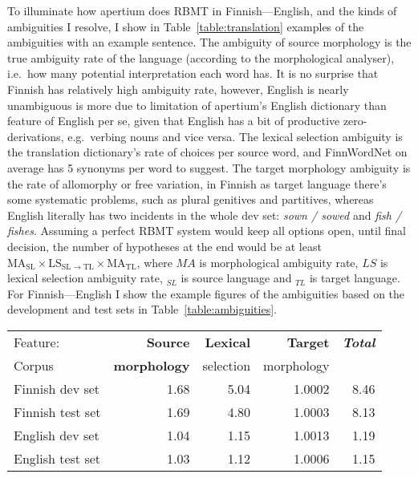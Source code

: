 \documentclass[free]{flammie}
\begin{document}
To illuminate how apertium does RBMT in Finnish---English, and the kinds of
ambiguities I resolve, I show in Table~\ref{table:translation} examples of the
ambiguities with an example sentence. The ambiguity of source morphology is the
true ambiguity rate of the language (according to the morphological analyser),
i.e.\ how many potential interpretation each word has. It is no surprise that
Finnish has relatively high ambiguity rate, however, English is nearly
unambiguous is more due to limitation of apertium's English dictionary than
feature of English per se, given that English has a bit of productive
zero-derivations, e.g.\ verbing nouns and vice versa. The lexical selection
ambiguity is the translation dictionary's rate of choices per source word, and
FinnWordNet on average has 5 synonyms per word to suggest. The target morphology
ambiguity is the rate of allomorphy or free variation, in Finnish as target
language there's some systematic problems, such as plural genitives and
partitives, whereas English literally has two incidents in the whole dev set:
\textit{sown / sowed} and \textit{fish / fishes}.  Assuming a perfect RBMT
system would keep all options open, until final decision, the number of
hypotheses at the end would be at least
$\mathrm{MA_{SL}}\times\mathrm{LS_{SL\rightarrow TL}}\times\mathrm{MA_{TL}}$,
where $MA$ is morphological ambiguity rate, $LS$ is lexical selection ambiguity
rate, $_{SL}$ is source language and $_{TL}$ is target language. For
Finnish---English I show the example figures of the ambiguities based on the
development and test sets in Table~\ref{table:ambiguities}.

\begin{table*}
    \begin{center}
    \begin{tabular}{lrrrr}
        \toprule
        \hfill Feature: & \bf Source & \bf Lexical & \bf
        Target & \bf \it Total\\
        Corpus & \bf morphology & selection & morphology & \\
        \midrule
        Finnish dev set & 1.68 & 5.04 & 1.0002 & 8.46 \\
        Finnish test set & 1.69 & 4.80 & 1.0003 & 8.13 \\
        \midrule
        English dev set & 1.04 & 1.15 & 1.0013 & 1.19 \\
        English test set & 1.03 & 1.12 & 1.0006 & 1.15\\
        \bottomrule
    \end{tabular}
    \caption{Ambiguity influencing RBMT Finnish-to-English and
    English-to-Finnish\label{table:ambiguities}}
    \end{center}
\end{table*}
\end{document}
